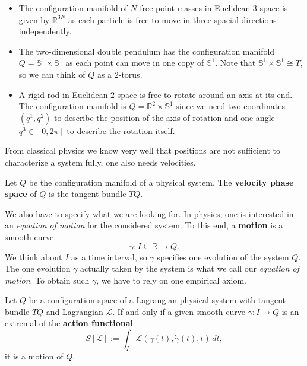 \begin{eg}
    \begin{itemize}
        \item The configuration manifold of $N$ free point masses in Euclidean $3$-space is given by $\mathbb{R}^{3N}$ as each particle is free to move in three spacial directions independently.
        \item The two-dimensional double pendulum has the configuration manifold $Q=\mathbb{S}^1 \times \mathbb{S}^1$ as each point can move in one copy of $\mathbb{S}^1$. Note that $\mathbb{S}^1 \times \mathbb{S}^1 \cong T$, so we can think of $Q$ as a $2$-torus.
        \item A rigid rod in Euclidean $2$-space is free to rotate around an axis at its end. The configuration manifold is $Q=\mathbb{R}^2 \times \mathbb{S}^1$ since we need two coordinates $(q^1,q^2)$ to describe the position of the axis of rotation and one angle $q^3 \in [0, 2\pi]$ to describe the rotation itself.
    \end{itemize}
\end{eg}
From classical physics we know very well that positions are not sufficient to characterize a system fully, one also needs velocities.
\begin{definition}
    Let $Q$ be the configuration manifold of a physical system. The \textbf{velocity phase space} of $Q$ is the tangent bundle $TQ$.
\end{definition}
We also have to specify what we are looking for. In physics, one is interested in an \emph{equation of motion} for the considered system. To this end, a \textbf{motion} is a smooth curve
\[
\gamma: I \subseteq \mathbb{R} \to Q
.\] 
We think about $I$ as a time interval, so $\gamma$ specifies one evolution of the system $Q$. The one evolution $\gamma$ actually taken by the system is what we call our \emph{equation of motion}. To obtain such $\gamma$, we have to rely on one empirical axiom.
\begin{axiom}
    Let $Q$ be a configuration space of a Lagrangian physical system with tangent bundle $TQ$ and Lagrangian $\mathcal{L}$. If and only if a given smooth curve $\gamma: I \to Q$ is an extremal of the \textbf{action functional}
    \[
        S[\mathcal{L}] := \int_I \mathcal{L}(\gamma(t), \dot{\gamma}(t),t)\, dt
    ,\] it is a motion of $Q$. 
\end{axiom}
